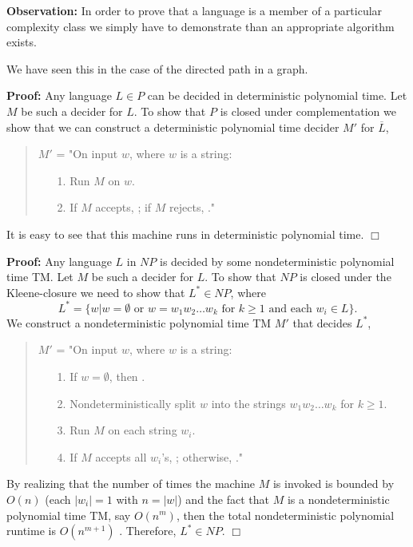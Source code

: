 \documentclass[a4paper,blends,pdf,colorBG,slideColor]{prosper}
\begin{document}

\fdef{
\[
NP = \bigcup_k NTIME(n^k), \mbox{ for $k \ge 0$}.
\]}

{\bf Observation:} In order to prove that a language is a member of a particular
complexity class we simply have to demonstrate than an appropriate algorithm
exists.  

We have seen this in the case of the directed path in a graph.
\es


{\bf Proof:} Any language $L \in P$ can be decided in deterministic polynomial time.  Let $M$
be such a decider for $L$.  To show that $P$ is closed under complementation we show that
we can construct a deterministic polynomial time decider $M'$ for $\overline{L}$,
\begin{quote}
$M'$ = "On input $w$, where $w$ is a string:
\begin{itemize}
\item[1.] Run $M$ on $w$.
\item[2.] If $M$ accepts, \reject; if $M$ rejects, \accept."
\end{itemize}
\end{quote}
It is easy to see that this machine runs in deterministic polynomial time. $\Box$
\es


{\small
{}

{\bf Proof:} Any language $L$ in $NP$ is decided by some nondeterministic polynomial time TM.  Let $M$ be such a decider for $L$.  To show that $NP$ is closed under the Kleene-closure we need to show that
$L^* \in NP$, where \[L^* = \{ w | \mbox{$w = \emptyset$ or $w = w_1 w_2 \ldots w_k$ for $k \ge 1$ and each $w_i \in L$} \}.\]
We construct a nondeterministic polynomial time TM $M'$ that decides $L^*$,
\begin{quote}
$M'$ = "On input $w$, where $w$ is a string:
\begin{itemize}
\item[1.] If $w = \emptyset$, then \accept.
\item[2.] Nondeterministically split $w$ into the strings $w_1 w_2 \ldots w_k$ for $k \ge 1$.
\item[3.] Run $M$ on each string $w_i$.
\item[4.] If $M$ accepts all $w_i$'s, \accept; otherwise, \reject."
\end{itemize}
\end{quote}
By realizing that the number of times the machine $M$ is invoked is bounded by $O(n)$ (each $|w_i| = 1$
with $n = |w|$) and the fact that $M$ is a nondeterministic polynomial time TM, say $O(n^m)$, then the total nondeterministic polynomial runtime is $O(n^{m+1})$ .  Therefore, $L^* \in NP$. $\Box$
}
\es
\end{document}
